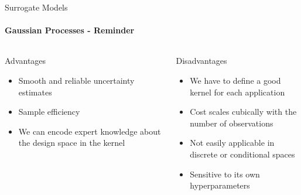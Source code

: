 \begin{frame}[c]{Surrogate Models}
\framesubtitle{Gaussian Processes - Reminder}

\begin{columns}[T] %
\begin{column}{.48\textwidth}

    \begin{block}{Advantages}
    \begin{itemize}
    	\item Smooth and reliable uncertainty estimates 
		\item Sample efficiency
    	\item We can encode expert knowledge about the design space in the kernel 
    \end{itemize}
    \end{block}
\end{column}%

\hfill%
\pause

\begin{column}{.48\textwidth}
    \begin{block}{Disadvantages}
    \begin{itemize}
    	\item We have to define a good kernel for each application 
    	\item Cost scales cubically with the number of observations 
    	\item Not easily applicable in discrete or conditional spaces 
    	\item Sensitive to its own hyperparameters
    \end{itemize}
\end{block}

\end{column}
\end{columns}

	

\end{frame}


